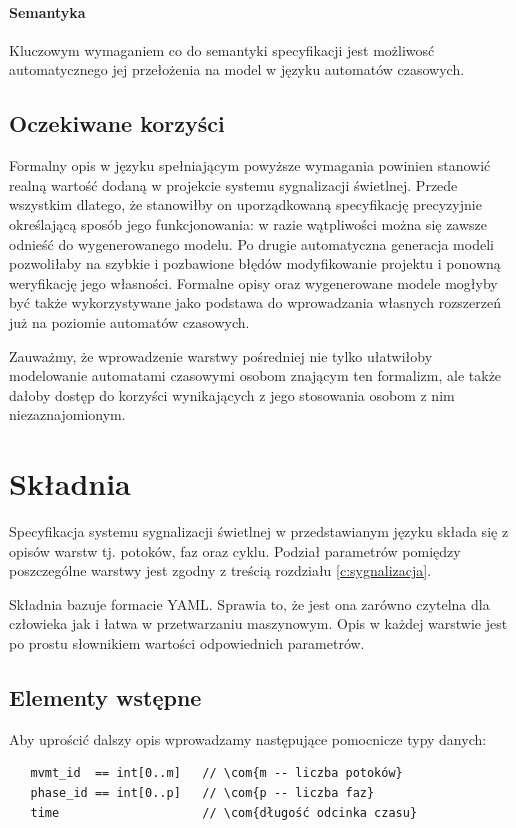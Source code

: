 \documentclass{pracamgr}
\theoremstyle{plain}
\newcommand{\com}[1]{\upshape\color{light-gray}{#1}}
\begin{document}
\paragraph{Semantyka} Kluczowym wymaganiem co do semantyki specyfikacji
jest możliwosć automatycznego jej przełożenia na model w języku
automatów czasowych.

\subsection{Oczekiwane korzyści}
\label{ss:lang:req:benefits}
Formalny opis w języku spełniającym powyższe wymagania powinien
stanowić realną wartość dodaną w projekcie systemu sygnalizacji
świetlnej. Przede wszystkim dlatego, że stanowiłby on uporządkowaną
specyfikację precyzyjnie określającą sposób jego funkcjonowania: w
razie wątpliwości można się zawsze odnieść do wygenerowanego modelu.
Po drugie automatyczna generacja modeli pozwoliłaby na szybkie i
pozbawione błędów modyfikowanie projektu i ponowną weryfikację jego
własności. Formalne opisy oraz wygenerowane modele mogłyby być także
wykorzystywane jako podstawa do wprowadzania własnych rozszerzeń już
na poziomie automatów czasowych.

Zauważmy, że wprowadzenie warstwy pośredniej nie tylko ułatwiłoby
modelowanie automatami czasowymi osobom znającym ten formalizm, ale
także dałoby dostęp do korzyści wynikających z jego stosowania osobom
z nim niezaznajomionym.

\section{Składnia}
\label{c:lang:lang}
Specyfikacja systemu sygnalizacji świetlnej w przedstawianym języku
składa się z opisów warstw tj. potoków, faz oraz cyklu.
Podział parametrów pomiędzy poszczególne warstwy jest zgodny
z treścią rozdziału \ref{c:sygnalizacja}.

Składnia bazuje formacie YAML\cite{YAML}. Sprawia to, że jest ona
zarówno czytelna dla człowieka jak i łatwa w przetwarzaniu
maszynowym. Opis w każdej warstwie jest po prostu słownikiem wartości
odpowiednich parametrów.


\subsection{Elementy wstępne}
Aby uprościć dalszy opis wprowadzamy następujące pomocnicze typy danych:
\begin{lstlisting}
   mvmt_id  == int[0..m]   // \com{m -- liczba potoków}
   phase_id == int[0..p]   // \com{p -- liczba faz}
   time                    // \com{długość odcinka czasu}
\end{lstlisting}
\end{document}
